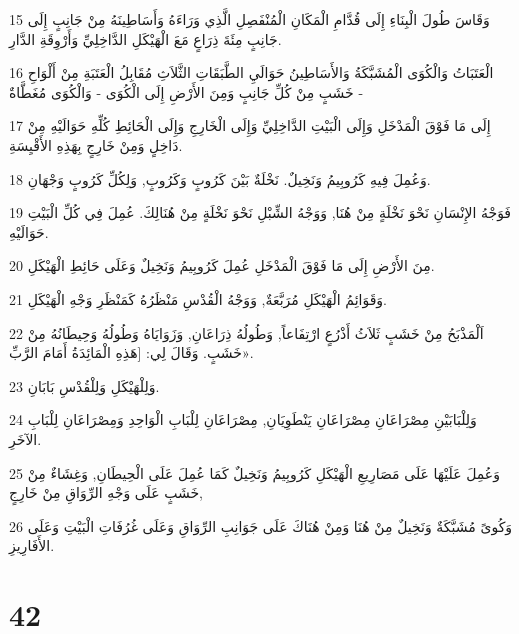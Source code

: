 \par 15 وَقَاسَ طُولَ الْبِنَاءِ إِلَى قُدَّامِ الْمَكَانِ الْمُنْفَصِلِ الَّذِي وَرَاءَهُ وَأَسَاطِينَهُ مِنْ جَانِبٍ إِلَى جَانِبٍ مِئَةَ ذِرَاعٍ مَعَ الْهَيْكَلِ الدَّاخِلِيِّ وَأَرْوِقَةِ الدَّارِ.
\par 16 الْعَتَبَاتُ وَالْكُوَى الْمُشَبَّكَةُ وَالأَسَاطِينُ حَوَالَيِ الطَّبَقَاتِ الثَّلاَثِ مُقَابِلُ الْعَتَبَةِ مِنْ أَلْوَاحِ خَشَبٍ مِنْ كُلِّ جَانِبٍ وَمِنَ الأَرْضِ إِلَى الْكُوَى - وَالْكُوَى مُغَطَّاةٌ -
\par 17 إِلَى مَا فَوْقَ الْمَدْخَلِ وَإِلَى الْبَيْتِ الدَّاخِلِيِّ وَإِلَى الْخَارِجِ وَإِلَى الْحَائِطِ كُلِّهِ حَوَالَيْهِ مِنْ دَاخِلٍ وَمِنْ خَارِجٍ بِهَذِهِ الأَقْيِسَةِ.
\par 18 وَعُمِلَ فِيهِ كَرُوبِيمُ وَنَخِيلٌ. نَخْلَةٌ بَيْنَ كَرُوبٍ وَكَرُوبٍ, وَلِكُلِّ كَرُوبٍ وَجْهَانِ.
\par 19 فَوَجْهُ الإِنْسَانِ نَحْوَ نَخْلَةٍ مِنْ هُنَا, وَوَجْهُ الشِّبْلِ نَحْوَ نَخْلَةٍ مِنْ هُنَالِكَ. عُمِلَ فِي كُلِّ الْبَيْتِ حَوَالَيْهِ.
\par 20 مِنَ الأَرْضِ إِلَى مَا فَوْقَ الْمَدْخَلِ عُمِلَ كَرُوبِيمُ وَنَخِيلٌ وَعَلَى حَائِطِ الْهَيْكَلِ.
\par 21 وَقَوَائِمُ الْهَيْكَلِ مُرَبَّعَةٌ, وَوَجْهُ الْقُدْسِ مَنْظَرُهُ كَمَنْظَرِ وَجْهِ الْهَيْكَلِ.
\par 22 اَلْمَذْبَحُ مِنْ خَشَبٍ ثَلاَثُ أَذْرُعٍ ارْتِفَاعاً, وَطُولُهُ ذِرَاعَانِ, وَزَوَايَاهُ وَطُولُهُ وَحِيطَانُهُ مِنْ خَشَبٍ. وَقَالَ لِي: [هَذِهِ الْمَائِدَةُ أَمَامَ الرَّبِّ».
\par 23 وَلِلْهَيْكَلِ وَلِلْقُدْسِ بَابَانِ.
\par 24 وَلِلْبَابَيْنِ مِصْرَاعَانِ مِصْرَاعَانِ يَنْطَوِيَانِ, مِصْرَاعَانِ لِلْبَابِ الْوَاحِدِ وَمِصْرَاعَانِ لِلْبَابِ الآخَرِ.
\par 25 وَعُمِلَ عَلَيْهَا عَلَى مَصَارِيعِ الْهَيْكَلِ كَرُوبِيمُ وَنَخِيلٌ كَمَا عُمِلَ عَلَى الْحِيطَانِ, وَغِشَاءٌ مِنْ خَشَبٍ عَلَى وَجْهِ الرِّوَاقِ مِنْ خَارِجٍ,
\par 26 وَكُوىً مُشَبَّكَةٌ وَنَخِيلٌ مِنْ هُنَا وَمِنْ هُنَاكَ عَلَى جَوَانِبِ الرِّوَاقِ وَعَلَى غُرُفَاتِ الْبَيْتِ وَعَلَى الأَفَارِيزِ.

\chapter{42}

